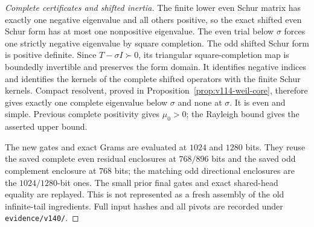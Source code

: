 \begin{proof}[Complete certificates and shifted inertia]
The finite lower even Schur matrix has exactly one negative eigenvalue
and all others positive, so the exact shifted even Schur form has
at most one nonpositive eigenvalue. The even trial below $\sigma$
forces one strictly negative eigenvalue by square completion.
The odd shifted Schur form is positive definite.
Since $T-\sigma I\succ0$, its triangular square-completion map is
boundedly invertible and preserves the form domain. It identifies
negative indices and identifies the kernels of the complete shifted
operators with the finite Schur kernels. Compact resolvent, proved
in Proposition~\ref{prop:v114-weil-core}, therefore gives exactly one
complete eigenvalue below $\sigma$ and none at $\sigma$. It is even
and simple. Previous complete positivity gives $\mu_0>0$; the
Rayleigh bound gives the asserted upper bound.

The new gates and exact Grams are evaluated at $1024$ and $1280$
bits. They reuse the saved complete even residual enclosures at
$768/896$ bits and the saved odd complement enclosure at $768$ bits;
the matching odd directional enclosures are the $1024/1280$-bit
ones. The small prior final gates and exact shared-head equality
are replayed. This is not represented as a fresh assembly of the
old infinite-tail ingredients. Full input hashes and all pivots are
recorded under \texttt{evidence/v140/}.
\end{proof}

